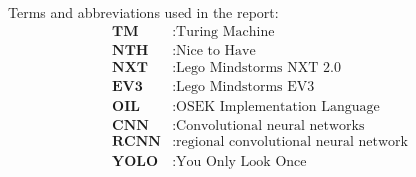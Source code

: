
Terms and abbreviations used in the report:
\begin{align*}
	\textbf{TM} &: \text{Turing Machine} \\
    \textbf{NTH} &: \text{Nice to Have} \\
    \textbf{NXT} &: \text{Lego Mindstorms NXT 2.0} \\
    \textbf{EV3} &: \text{Lego Mindstorms EV3} \\  
    \textbf{OIL} &: \text{OSEK Implementation Language} \\  
    \textbf{CNN} &: \text{Convolutional neural networks} \\ 
    \textbf{RCNN} &: \text{regional convolutional neural network} \\ 
    \textbf{YOLO} &: \text{You Only Look Once} \\ 
\end{align*}

